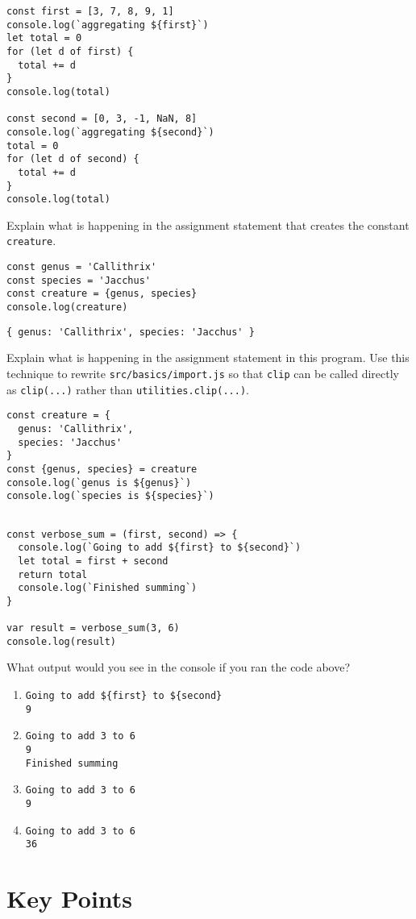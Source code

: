 \begin{verbatim}
const first = [3, 7, 8, 9, 1]
console.log(`aggregating ${first}`)
let total = 0
for (let d of first) {
  total += d
}
console.log(total)

const second = [0, 3, -1, NaN, 8]
console.log(`aggregating ${second}`)
total = 0
for (let d of second) {
  total += d
}
console.log(total)
\end{verbatim}


Explain what is happening in the assignment statement that creates the constant \texttt{creature}.

\begin{verbatim}
const genus = 'Callithrix'
const species = 'Jacchus'
const creature = {genus, species}
console.log(creature)
\end{verbatim}

\begin{verbatim}
{ genus: 'Callithrix', species: 'Jacchus' }
\end{verbatim}


Explain what is happening in the assignment statement in this program.
Use this technique to rewrite \texttt{src/basics/import.js}
so that \texttt{clip} can be called directly as \texttt{clip(...)} rather than \texttt{utilities.clip(...)}.

\begin{verbatim}
const creature = {
  genus: 'Callithrix',
  species: 'Jacchus'
}
const {genus, species} = creature
console.log(`genus is ${genus}`)
console.log(`species is ${species}`)
\end{verbatim}

\begin{verbatim}
  
const verbose_sum = (first, second) => {
  console.log(`Going to add ${first} to ${second}`)
  let total = first + second
  return total
  console.log(`Finished summing`)
}

var result = verbose_sum(3, 6)
console.log(result)
\end{verbatim}

What output would you see in the console if you ran the code above?

\begin{enumerate}
\item
  \texttt{Going\ to\ add\ \$\{first\}\ to\ \$\{second\}}\\
  \texttt{9}
\item
  \texttt{Going\ to\ add\ 3\ to\ 6}\\
  \texttt{9}\\
  \texttt{Finished\ summing}
\item
  \texttt{Going\ to\ add\ 3\ to\ 6}\\
  \texttt{9}
\item
  \texttt{Going\ to\ add\ 3\ to\ 6}\\
  \texttt{36}
\end{enumerate}

\section*{Key Points}


